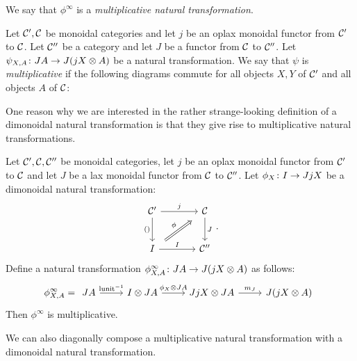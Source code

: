 \documentclass{article}
\begin{document}
We say that $\phi^\infty$ is a \emph{multiplicative natural transformation}.

\begin{definition}
  Let ${\mathcal{C}}',{\mathcal{C}}$ be monoidal categories and let $j$ be an oplax monoidal functor from ${\mathcal{C}}'$ to ${\mathcal{C}}$.  Let ${\mathcal{C}}''$ be a category and let $J$ be a functor from ${\mathcal{C}}$ to ${\mathcal{C}}''$.  
  Let $\psi_{X,A}\colon J A \to J(j X \otimes A)$ be a natural transformation.  
  We say that $\psi$ is \emph{multiplicative} if the following diagrams commute for all objects $X,Y$ of ${\mathcal{C}}'$ and all objects $A$ of ${\mathcal{C}}$:
\end{definition}

One reason why we are interested in the rather strange-looking definition of a dimonoidal natural transformation is that they give rise to multiplicative natural transformations.

\begin{proposition}
  Let ${\mathcal{C}}',{\mathcal{C}},{\mathcal{C}}''$ be monoidal categories, let $j$ be an oplax monoidal functor from ${\mathcal{C}}'$ to ${\mathcal{C}}$ and let $J$ be a lax monoidal functor from ${\mathcal{C}}$ to ${\mathcal{C}}''$.  
  Let $\phi_X\colon I \to J j X$ be a dimonoidal natural transformation:
  \[
    \begin{tikzcd}[row sep=24pt, column sep=36pt]
      \C' \arrow[r, "j"] \arrow[d, "()"']
        & \C \arrow[d, "J"] \\
      I \arrow[r, "I"]
        \arrow[ur,
               Rightarrow,
               start anchor={[xshift=6pt, yshift=4pt]},
               end anchor={[xshift=-6pt, yshift=-4pt]},
               "\phi"]
        & \C''
    \end{tikzcd}\,.
    \]
  Define a natural transformation $\phi^\infty_{X,A}\colon J A \to J (j X \otimes A)$ as follows:
  \[
    \phi^\infty_{X,A} =
    \begin{tikzcd}
      J A \arrow[r, "\lunit\inv"]
        & I \tensor J A \arrow[r, "\phi_X\tensor J A"]
          & J j X \tensor J A \arrow[r, "m_J"]
            & J (j X \tensor A)
    \end{tikzcd}
    \]
  Then $\phi^\infty$ is multiplicative.
\end{proposition}

We can also diagonally compose a multiplicative natural transformation with a dimonoidal natural transformation.
\end{document}
